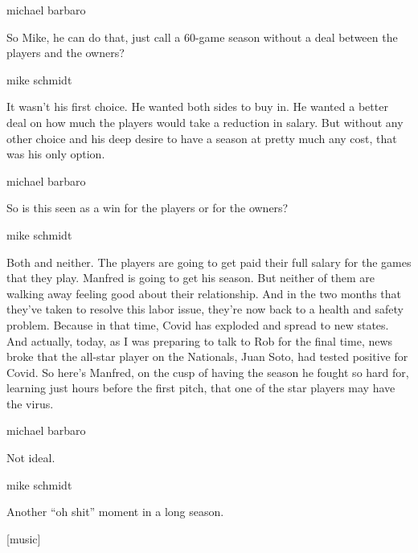 michael barbaro

So Mike, he can do that, just call a 60-game season without a deal
between the players and the owners?

mike schmidt

It wasn't his first choice. He wanted both sides to buy in. He wanted a
better deal on how much the players would take a reduction in salary.
But without any other choice and his deep desire to have a season at
pretty much any cost, that was his only option.

michael barbaro

So is this seen as a win for the players or for the owners?

mike schmidt

Both and neither. The players are going to get paid their full salary
for the games that they play. Manfred is going to get his season. But
neither of them are walking away feeling good about their relationship.
And in the two months that they've taken to resolve this labor issue,
they're now back to a health and safety problem. Because in that time,
Covid has exploded and spread to new states. And actually, today, as I
was preparing to talk to Rob for the final time, news broke that the
all-star player on the Nationals, Juan Soto, had tested positive for
Covid. So here's Manfred, on the cusp of having the season he fought so
hard for, learning just hours before the first pitch, that one of the
star players may have the virus.

michael barbaro

Not ideal.

mike schmidt

Another ``oh shit'' moment in a long season.

{[}music{]}

